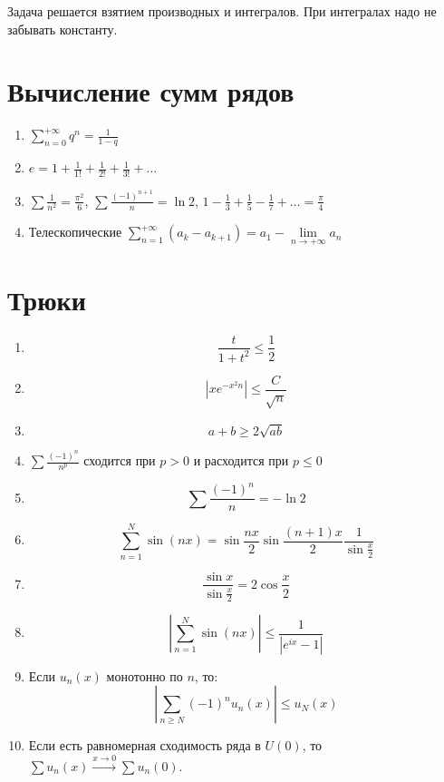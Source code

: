 Задача решается взятием производных и интегралов. При интегралах надо не забывать константу.

\section{Вычисление сумм рядов}

\begin{enumerate}
    \item \(\sum_{n = 0}^{ +\infty} q^n = \frac{1}{1 - q}\)
    \item \(e = 1 + \frac{1}{1!} + \frac{1}{2!} + \frac{1}{3!} + \dots \)
    \item \(\sum \frac{1}{n^2} = \frac{\pi^2}{6}\), \(\sum \frac{( - 1)^{n + 1}}{n} = \ln 2\), \(1 - \frac{1}{3} + \frac{1}{5} - \frac{1}{7} + \dots = \frac{\pi}{4}\)
    \item Телескопические \(\sum\limits_{n = 1}^{ +\infty} (a_k - a_{k + 1}) = a_1 - \lim\limits_{n\to +\infty} a_n\)
\end{enumerate}

\section*{Трюки}

\begin{enumerate}
    \item \[\frac{t}{1 + t^2} \leq \frac{1}{2}\]
    \item \[\left|xe^{ - x^2n}\right| \leq \frac{C}{\sqrt{n}}\]
    \item \[a + b \geq 2\sqrt{ab}\]
    \item \(\sum \frac{( - 1)^n}{n^p} \) сходится при \(p > 0\) и расходится при \(p \leq 0\)
    \item \[\sum \frac{( - 1)^n}{n} = -\ln 2\]
    \item \[\sum_{n = 1}^N \sin (nx) = \sin \frac{nx}{2} \sin \frac{(n + 1)x}{2} \frac{1}{\sin \frac{x}{2}}\]
    \item \[\frac{\sin x}{\sin \frac{x}{2}} = 2\cos \frac{x}{2}\]
    \item \[\left|\sum_{n = 1}^N \sin (nx)\right| \leq \frac{1}{|e^{ix} - 1|}\]
    \item Если \(u_n(x)\) монотонно по \(n\), то:
          \[\left|\sum_{n \geq N} ( - 1)^n u_n(x) \right| \leq u_N(x)\]
    \item Если есть равномерная сходимость ряда в \(U(0)\), то \(\sum u_n(x) \xrightarrow{x\to 0} \sum u_n(0)\).
\end{enumerate}

